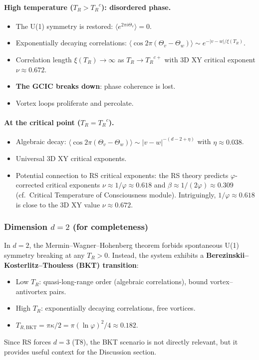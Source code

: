 \documentclass[11pt]{article}
\theoremstyle{definition}
\newcommand{\TR}{{T_R}}
\newcommand{\phig}{\varphi}
\begin{document}
\paragraph{High temperature ($\TR > \TR^c$): disordered phase.}
\begin{itemize}[nosep]
\item The U(1) symmetry is restored: $\langle e^{2\pi i \Theta_v}\rangle = 0$.
\item Exponentially decaying correlations: $\langle \cos 2\pi(\Theta_v - \Theta_w)\rangle \sim e^{-|v-w|/\xi(\TR)}$.
\item Correlation length $\xi(\TR) \to \infty$ as $\TR \to \TR^{c+}$ with 3D XY critical exponent $\nu \approx 0.672$.
\item \textbf{The GCIC breaks down}: phase coherence is lost.
\item Vortex loops proliferate and percolate.
\end{itemize}

\paragraph{At the critical point ($\TR = \TR^c$).}
\begin{itemize}[nosep]
\item Algebraic decay: $\langle \cos 2\pi(\Theta_v - \Theta_w)\rangle \sim |v-w|^{-(d-2+\eta)}$ with $\eta \approx 0.038$.
\item Universal 3D XY critical exponents.
\item Potential connection to RS critical exponents: the RS theory predicts $\phig$-corrected critical exponents $\nu \approx 1/\phig \approx 0.618$ and $\beta \approx 1/(2\phig) \approx 0.309$ (cf.~Critical Temperature of Consciousness module). Intriguingly, $1/\phig \approx 0.618$ is close to the 3D XY value $\nu \approx 0.672$.
\end{itemize}

\subsubsection{Dimension $d = 2$ (for completeness)}

In $d = 2$, the Mermin--Wagner--Hohenberg theorem forbids spontaneous U(1) symmetry breaking at any $\TR > 0$. Instead, the system exhibits a \textbf{Berezinskii--Kosterlitz--Thouless (BKT) transition}:
\begin{itemize}[nosep]
\item Low $\TR$: quasi-long-range order (algebraic correlations), bound vortex--antivortex pairs.
\item High $\TR$: exponentially decaying correlations, free vortices.
\item $T_{R,\mathrm{BKT}} = \pi\kappa/2 = \pi(\ln\phig)^2/4 \approx 0.182$.
\end{itemize}
Since RS forces $d = 3$ (T8), the BKT scenario is not directly relevant, but it provides useful context for the Discussion section.
\end{document}

